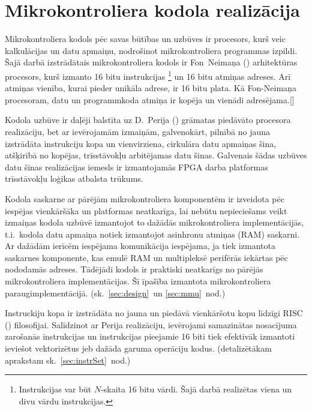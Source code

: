 \section{Mikrokontroliera kodola realizācija} \label{sec:cpu}
	Mikrokontroliera kodols pēc savas būtības un uzbūves ir procesors,
	kurš veic kalkulācijas un datu apmaiņu, nodrošinot mikrokontroliera
	programmas izpildi.
	Šajā darbā izstrādātais mikrokontroliera kodols ir 
	Fon~Neimaņa () arhitektūras pro\-ce\-sors, kurš
	izmanto 16 bitu instrukcijas%
		\footnote{Instrukcijas var būt $N$-skaita 16 bitu vārdi. 
		Šajā darbā realizētas viena un divu vārdu instrukcijas.}
	un 16 bitu atmiņas adreses. Arī atmiņas vienība, kurai pieder unikāla
	adrese, ir 16 bitu plata. Kā Fon-Neimaņa procesoram, datu un
	programmkoda atmiņa ir kopēja un vienādi adresējama.[\todo]
	
	Kodola uzbūve ir daļēji balstīta uz D.~Perija () grāmatas%
	\cite{Perry-VHDL} piedāvāto procesora reali\-zā\-ciju, 
	bet ar ievērojamām izmaiņām, galvenokārt, pilnībā no jauna izstrādāta 
	instrukciju kopa un vienvirziena,
	cirkulāra datu apmaiņas šina, atšķirībā no kopējas,
	trīs\-stāvokļu arbitējamas datu šinas.
	Galvenais šādas uzbūves datu šinas realizācijas iemesls
	ir izmantojamās  FPGA darba platformas trīs\-stāvokļu
	loģikas atbalsta \mbox{trūkums.\cite[18.~lpp.]{FusionFAQ}}
	
	Kodola saskarne ar pārējām mikrokontroliera komponentēm ir izveidota
	pēc iespējas vienkāršāka un platformas neatkarīga, lai nebūtu nepieciešams
	veikt izmaiņas kodola uzbūvē izmantojot to dažādās mikrokontroliera
	implementācijās, t.i.~kodola datu apmaiņa notiek izmantojot
	asinhronu atmiņas (RAM)	saskarni. Ar dažādām ierīcēm iespējama
	komunikācija iespējama, ja tiek izmantota saskarnes komponente, kas
	emulē RAM un multipleksē perifērās iekārtas pēc nododamās adreses.
	Tādējādi kodols	ir praktiski neatkarīgs no pārējās 
	mikrokontroliera implementācijas.
	Šī īpašība izmantota mikrokontroliera paraugimplementācijā.
	(sk.~\ref{sec:design}~un \ref{sec:mmu}~nod.)
	
	Instruckiju kopa ir izstrādāta no jauna un piedāvā vienkāršotu
	kopu līdzīgi RISC ()
	filo\-so\-fijai. Salīdzinot ar Perija realizāciju, ievērojami samazinātas
	nosacījuma zarošanās instrukcijas un instrukcijas pieejamie 16 biti
	tiek efektīvāk izmantoti ieviešot vektorizētus jeb dažāda garuma
	operāciju kodus. (detalizētākam aprakstam sk.~\ref{sec:instrSet}~nod.)
	

